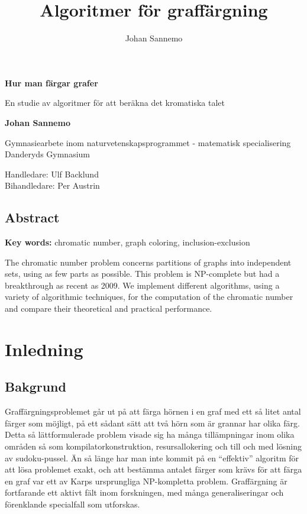 \documentclass[a4paper]{report}
\title{Algoritmer för graffärgning}
\author{Johan Sannemo}
\date{}
\begin{document}
\begin{titlepage}
\begin{center}
\vspace*{1cm}
\Huge
\textbf{Hur man färgar grafer}
\vspace{0.5cm}
\large

En studie av algoritmer för att beräkna det kromatiska talet

\vspace{1.5cm}

\textbf{Johan Sannemo}


\end{center}
\vfill
\normalsize
Gymnasiearbete inom naturvetenskapsprogrammet - matematisk specialisering\\
Danderyds Gymnasium
\vspace{0.8cm}

\normalsize
Handledare: Ulf Backlund\\
Bihandledare: Per Austrin\\

\end{titlepage}

\clearpage
\section*{Abstract}
\textbf{Key words:} chromatic number, graph coloring, inclusion-exclusion

The chromatic number problem concerns partitions of graphs into independent sets, using as few parts as possible. This problem is
NP-complete but had a breakthrough as recent as 2009. We implement different algorithms, using a variety of algorithmic techniques,
for the computation of the chromatic number and compare their theoretical and practical performance.

\tableofcontents

\chapter{Inledning}
\section{Bakgrund}
Graffärgningsproblemet går ut på att färga hörnen i en graf med ett så litet antal färger som möjligt, på ett sådant sätt att två hörn som är grannar har olika färg. Detta så lättformulerade problem visade sig ha många tillämpningar inom olika områden så som kompilatorkonstruktion, resursallokering och till och med lösning av sudoku-pussel. Än så länge har man inte kommit på en ``effektiv'' algoritm för att lösa problemet exakt, och att bestämma antalet färger som krävs för att färga en graf var ett av Karps ursprungliga NP-kompletta problem. Graffärgning är fortfarande ett aktivt fält inom forskningen, med många generaliseringar och förenklande specialfall som utforskas.
\end{document}
